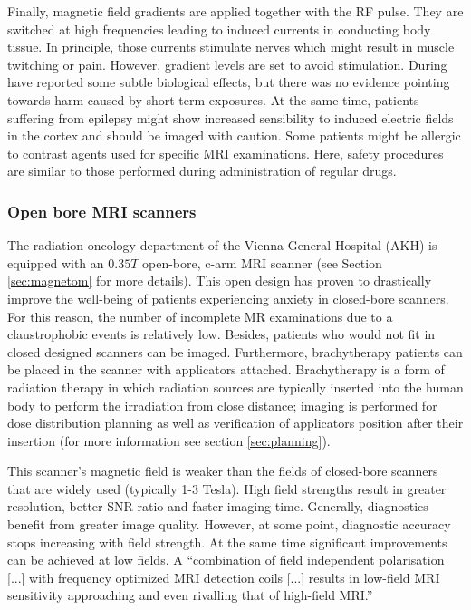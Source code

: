 Finally, magnetic field gradients are applied together with the RF pulse.
They are switched at high frequencies leading to induced currents in conducting body tissue.
In principle, those currents stimulate nerves which might result in muscle twitching or pain.
However, gradient levels are set to avoid stimulation.
During have reported some subtle biological effects, but there was no evidence pointing towards harm caused by short term exposures.
At the same time, patients suffering from epilepsy might show increased sensibility to induced electric fields in the cortex and should be imaged with caution. \cite{Maidment2014}
Some patients might be allergic to contrast agents used for specific MRI examinations.
Here, safety procedures are similar to those performed during administration of regular drugs. 

\subsubsection{Open bore MRI scanners}

The radiation oncology department of the Vienna General Hospital (AKH) is equipped with an $0.35  T$ open-bore, c-arm MRI scanner (see Section \ref{sec:magnetom} for more details).
This open design has proven to drastically improve the well-being of patients experiencing anxiety in closed-bore scanners.
For this reason, the number of incomplete MR examinations due to a claustrophobic events is relatively low. \cite{Enders2011, Bangard2007}
Besides, patients who would not fit in closed designed scanners can be imaged.
Furthermore, brachytherapy patients can be placed in the scanner with applicators attached.
Brachytherapy is a form of radiation therapy in which radiation sources are typically inserted into the human body to perform the irradiation from close distance; imaging is performed for dose distribution planning as well as verification of applicators position after their insertion (for more information see section \ref{sec:planning}).

This scanner's magnetic field is weaker than the fields of closed-bore scanners that are widely used (typically 1-3 Tesla).
High field strengths result in greater resolution, better SNR ratio and faster imaging time.
Generally, diagnostics benefit from greater image quality.
However, at some point, diagnostic accuracy stops increasing with field strength.
At the same time significant improvements can be achieved at low fields.
A ``combination of field independent polarisation [...] with frequency optimized MRI detection coils [...] results in low-field MRI sensitivity approaching and even rivalling that of high-field MRI.'' \cite{Coffey2013}

